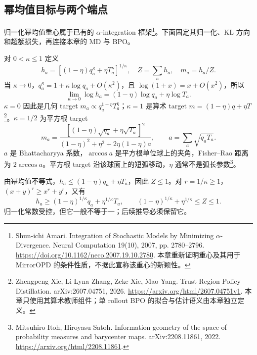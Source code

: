 \subsection{幂均值目标与两个端点}

归一化幂均值重心属于已有的 $\alpha$-integration 框架\footnote{Shun-ichi Amari. Integration of Stochastic Models by Minimizing $\alpha$-Divergence. Neural Computation 19(10), 2007, pp. 2780--2796. \url{https://doi.org/10.1162/neco.2007.19.10.2780}. 本章重新证明重心及其用于 MirrorOPD 的条件性质，不据此宣称该重心的新颖性。}。下面固定其归一化、KL 方向和超额损失，再连接本章的 MD 与 BPO。

对 $0<\kappa\le1$ 定义
\begin{equation}
 h_a=[(1-\eta)q_a^\kappa+\eta T_a^\kappa]^{1/\kappa},\quad
 Z=\sum_ah_a,\quad m_a=h_a/Z.
 \label{eq:proximal-power-target}
\end{equation}
当 $\kappa\to0$，$q_a^\kappa=1+\kappa\log q_a+O(\kappa^2)$，且 $\log(1+x)=x+O(x^2)$，所以
\begin{equation}
 \lim_{\kappa\to0}\log h_a=(1-\eta)\log q_a+\eta\log T_a.
\end{equation}
$\kappa=0$ 因此是几何 target $m_a\propto q_a^{1-\eta}T_a^\eta$；$\kappa=1$ 是算术 target $m=(1-\eta)q+\eta T$\footnote{Zhengpeng Xie, Li Lyna Zhang, Zeke Xie, Mao Yang. Trust Region Policy Distillation. arXiv:2607.04751, 2026. \url{https://arxiv.org/html/2607.04751v1}. 本章只使用其算术教师组件；单 rollout BPO 的拟合与估计语义由本章独立定义。}。$\kappa=1/2$ 为平方根 target
\begin{equation}
 m_a=\frac{[(1-\eta)\sqrt{q_a}+\eta\sqrt{T_a}]^2}
 {(1-\eta)^2+\eta^2+2\eta(1-\eta)a},\qquad
 a=\sum_a\sqrt{q_aT_a}.
 \label{eq:proximal-square-root}
\end{equation}
$a$ 是 Bhattacharyya 系数，$\arccos a$ 是平方根单位球上的夹角，Fisher--Rao 距离为 $2\arccos a$。平方根 target 沿该球面上的短弧移动，$\eta$ 通常不是弧长参数\footnote{Mitsuhiro Itoh, Hiroyasu Satoh. Information geometry of the space of probability measures and barycenter maps. arXiv:2208.11861, 2022. \url{https://arxiv.org/html/2208.11861}.}。

由幂均值不等式，$h_a\le(1-\eta)q_a+\eta T_a$，因此 $Z\le1$。对 $r=1/\kappa\ge1$，$(x+y)^r\ge x^r+y^r$，又有
\begin{equation}
 h_a\ge(1-\eta)^{1/\kappa}q_a+\eta^{1/\kappa}T_a,
 \qquad
 (1-\eta)^{1/\kappa}+\eta^{1/\kappa}\le Z\le1.
\end{equation}
归一化常数受控，但它一般不等于一；后续推导必须保留它。

